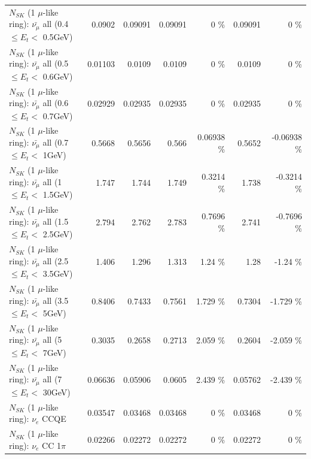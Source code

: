 \begin{table}
\begin{tabular}{| l | r | r | r  r | r  r |}
 $N_{SK}$ (1 $\mu$-like ring): $\bar{\nu_{\mu}}$ all (0.4 $\leq E_{t} <$ 0.5GeV) &          0.0902 &         0.09091 &         0.09091 &        0 \%  &         0.09091 &        0 \%  \\ 
 $N_{SK}$ (1 $\mu$-like ring): $\bar{\nu_{\mu}}$ all (0.5 $\leq E_{t} <$ 0.6GeV) &         0.01103 &          0.0109 &          0.0109 &        0 \%  &          0.0109 &        0 \%  \\ 
 $N_{SK}$ (1 $\mu$-like ring): $\bar{\nu_{\mu}}$ all (0.6 $\leq E_{t} <$ 0.7GeV) &         0.02929 &         0.02935 &         0.02935 &        0 \%  &         0.02935 &        0 \%  \\ 
   $N_{SK}$ (1 $\mu$-like ring): $\bar{\nu_{\mu}}$ all (0.7 $\leq E_{t} <$ 1GeV) &          0.5668 &          0.5656 &           0.566 &  0.06938 \%  &          0.5652 & -0.06938 \%  \\ 
   $N_{SK}$ (1 $\mu$-like ring): $\bar{\nu_{\mu}}$ all (1 $\leq E_{t} <$ 1.5GeV) &           1.747 &           1.744 &           1.749 &   0.3214 \%  &           1.738 &  -0.3214 \%  \\ 
 $N_{SK}$ (1 $\mu$-like ring): $\bar{\nu_{\mu}}$ all (1.5 $\leq E_{t} <$ 2.5GeV) &           2.794 &           2.762 &           2.783 &   0.7696 \%  &           2.741 &  -0.7696 \%  \\ 
 $N_{SK}$ (1 $\mu$-like ring): $\bar{\nu_{\mu}}$ all (2.5 $\leq E_{t} <$ 3.5GeV) &           1.406 &           1.296 &           1.313 &     1.24 \%  &            1.28 &    -1.24 \%  \\ 
   $N_{SK}$ (1 $\mu$-like ring): $\bar{\nu_{\mu}}$ all (3.5 $\leq E_{t} <$ 5GeV) &          0.8406 &          0.7433 &          0.7561 &    1.729 \%  &          0.7304 &   -1.729 \%  \\ 
     $N_{SK}$ (1 $\mu$-like ring): $\bar{\nu_{\mu}}$ all (5 $\leq E_{t} <$ 7GeV) &          0.3035 &          0.2658 &          0.2713 &    2.059 \%  &          0.2604 &   -2.059 \%  \\ 
    $N_{SK}$ (1 $\mu$-like ring): $\bar{\nu_{\mu}}$ all (7 $\leq E_{t} <$ 30GeV) &         0.06636 &         0.05906 &          0.0605 &    2.439 \%  &         0.05762 &   -2.439 \%  \\ 
\hline
\hline
\hline
                                      $N_{SK}$ (1 $\mu$-like ring): $\nu_e$ CCQE &         0.03547 &         0.03468 &         0.03468 &        0 \%  &         0.03468 &        0 \%  \\ 
                                 $N_{SK}$ (1 $\mu$-like ring): $\nu_e$ CC 1$\pi$ &         0.02266 &         0.02272 &         0.02272 &        0 \%  &         0.02272 &        0 \%  \\ 

\end{tabular}
\end{table}
